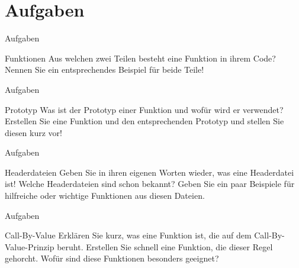 \documentclass[usenames,dvipsnames,10pt]{beamer}
\begin{document}
    \section{Aufgaben}
    \begin{frame}{Aufgaben}
        \begin{block}{Funktionen}
            Aus welchen zwei Teilen besteht eine Funktion in ihrem Code? Nennen Sie ein entsprechendes Beispiel für
            beide Teile!
        \end{block}
    \end{frame}
    \begin{frame}{Aufgaben}
        \begin{block}{Prototyp}
            Was ist der Prototyp einer Funktion und wofür wird er verwendet? Erstellen Sie eine Funktion und den entsprechenden Prototyp und 
            stellen Sie diesen kurz vor!
        \end{block}
    \end{frame}
    \begin{frame}{Aufgaben}
        \begin{block}{Headerdateien}
            Geben Sie in ihren eigenen Worten wieder, was eine Headerdatei ist! Welche Headerdateien sind schon bekannt?
            Geben Sie ein paar Beispiele für hilfreiche oder wichtige Funktionen aus diesen Dateien.
        \end{block}
    \end{frame}
    \begin{frame}{Aufgaben}
        \begin{block}{Call-By-Value}
            Erklären Sie kurz, was eine Funktion ist, die auf dem Call-By-Value-Prinzip beruht. Erstellen Sie schnell eine Funktion, die dieser Regel
            gehorcht. Wofür sind diese Funktionen besonders geeignet?
        \end{block}
    \end{frame}
\end{document}
